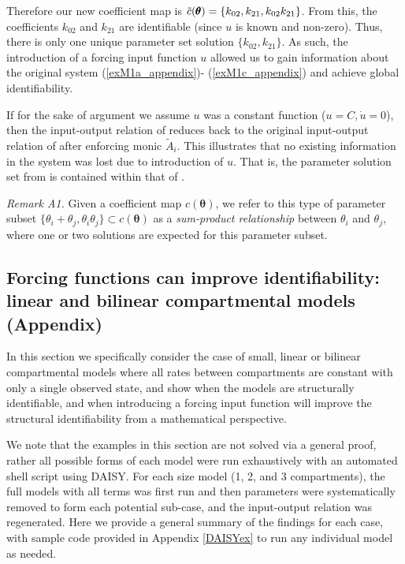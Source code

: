 \documentclass[a4paper,fleqn]{cas-dc}
\theoremstyle{definition}
\begin{document}

Therefore our new coefficient map is $\tilde{c}(\pmb{\theta}) = \{ k_{02}, k_{21}, \\k_{02}k_{21}\}$.
From this, the coefficients $k_{02}$ and $k_{21}$ are identifiable (since $u$ is known and non-zero).
Thus, there is only one unique parameter set solution $\{k_{02}, k_{21}\}$.
As such, the introduction of a forcing input function $u$ allowed us to gain information about the original system (\ref{exM1a_appendix})- (\ref{exM1c_appendix}) and achieve global identifiability.

If for the sake of argument we assume $u$ was a constant function ($u=C, \dot{u}=0$), then the input-output relation of  reduces back to the original input-output relation of  after enforcing monic $\tilde{A}_i$. 
This illustrates that no existing information in the system was lost due to introduction of $u$.
That is, the parameter solution set from  is contained within that of .

\setlength{\leftskip}{0.5cm}
\vspace{0.2cm}
\noindent \textit{Remark A1. }
    Given a coefficient map $c(\pmb{\theta})$, we refer to this type of parameter subset $\{\theta_i + \theta_j, \theta_i \theta_j \} \subset c(\pmb{\theta})$ as a \textit{sum-product relationship} between $\theta_i$ and $\theta_j$, where one or two solutions are expected for this parameter subset.
 \setlength{\leftskip}{0cm}


\subsection{Forcing functions can improve identifiability: linear and bilinear compartmental models (Appendix)} \label{s:3dim_appendix}

\noindent In this section we specifically consider the case of small, linear or bilinear compartmental models where all rates between compartments are constant with only a single observed state, and show when the models are structurally identifiable, and when introducing a forcing input function will improve the structural identifiability from a mathematical perspective.

We note that  the examples in this section are not solved via a general proof, rather all possible forms of each model were run exhaustively with an automated shell script using DAISY. For each size model (1, 2, and 3 compartments), the full models with all terms was first run and then parameters were systematically removed to form each potential sub-case, and the input-output relation was regenerated.
Here we provide a general summary of the findings for each case, with sample code provided in Appendix \ref{DAISYex} to run any individual model as needed.
\end{document}
